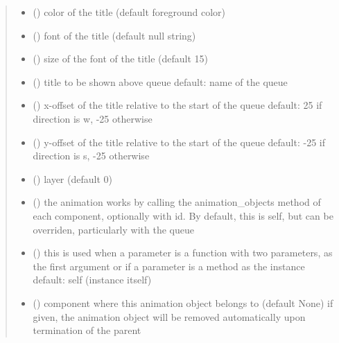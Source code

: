 \documentclass[letterpaper,10pt,english]{sphinxmanual}
\begin{document}
\begin{fulllineitems}
\begin{quote}
\begin{description}
\begin{itemize}
\item {} 
 () \textendash{} color of the title (default foreground color)

\item {} 
 ({\hyperref[\detokenize{Reference:salabim.Animate.font}]{}}) \textendash{} font of the title (default null string)

\item {} 
 () \textendash{} size of the font of the title (default 15)

\item {} 
 () \textendash{} title to be shown above queue 
default: name of the queue

\item {} 
 () \textendash{} x-offset of the title relative to the start of the queue 
default: 25 if direction is w, -25 otherwise

\item {} 
 () \textendash{} y-offset of the title relative to the start of the queue 
default: -25 if direction is s, -25 otherwise

\item {} 
 () \textendash{} layer (default 0)

\item {} 
 () \textendash{} the animation works by calling the animation\_objects method of each component, optionally
with id. By default, this is self, but can be overriden, particularly with the queue

\item {} 
 () \textendash{} this is used when a parameter is a function with two parameters, as the first argument or
if a parameter is a method as the instance 
default: self (instance itself)

\item {} 
 ({\hyperref[\detokenize{Reference:salabim.Component}]{}}) \textendash{} component where this animation object belongs to (default None) 
if given, the animation object will be removed
automatically upon termination of the parent


\end{itemize}
\end{description}
\end{quote}
\end{fulllineitems}
\end{document}
